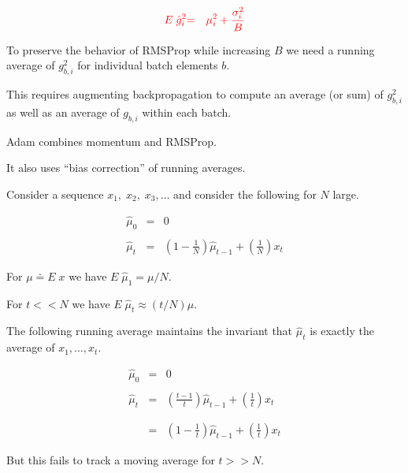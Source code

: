 {\begin{eqnarray*}
{\color{red} E\; \hat{g}_i^2} & {\color{red} = } &{\color{red} \mu_i^2 + \frac{\sigma_i^2}{B}}
\end{eqnarray*}

\vfill
To preserve the behavior of RMSProp while increasing $B$ we need a running average of $g_{b,i}^2$ for individual batch elements $b$.

\vfill
This requires augmenting backpropagation to compute an average (or sum) of $g_{b,i}^2$ as well as an average of
$g_{b,i}$ within each batch.


Adam combines momentum and RMSProp.

\vfill
It also uses ``bias correction'' of running averages.


Consider a sequence $x_1,\;x_2,\;x_3,\ldots$ and consider the following for $N$ large.

\begin{eqnarray*}
\hat{\mu}_0 & = & 0 \\
\\
\hat{\mu}_t & = & \left(1-\frac{1}{N}\right)\hat{\mu}_{t-1} + \left(\frac{1}{N}\right)x_t
\end{eqnarray*}

\vfill
For $\mu \doteq E\;x$ we have $E\;\hat{\mu}_1 = \mu/N$.

\vfill
For $t << N$ we have $E\;\hat{\mu}_t \approx (t/N)\mu$.


The following running average maintains the invariant that $\hat{\mu}_t$ is exactly the average of $x_1,\ldots,x_t$.

\begin{eqnarray*}
\hat{\mu}_0 & = & 0 \\
\\
\hat{\mu}_t & = & \left(\frac{t-1}{t}\right)\hat{\mu}_{t-1} + \left(\frac{1}{t}\right)x_t \\
\\
\\
& = & \left(1-\frac{1}{t}\right)\hat{\mu}_{t-1} + \left(\frac{1}{t}\right)x_t
\end{eqnarray*}

\vfill
But this fails to track a moving average for $t >> N$.


}
